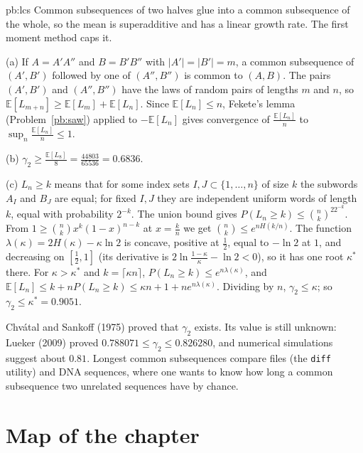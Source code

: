 \begin{solution}{pb:lcs}
\idea Common subsequences of two halves glue into a common subsequence of the whole, so the mean is superadditive and has a linear growth rate. The first moment
method caps it.

\writeup (a) If $A=A'A''$ and $B=B'B''$ with $|A'|=|B'|=m$, a common subsequence of $(A',B')$ followed by one of $(A'',B'')$ is common to $(A,B)$. The pairs $(A',B')$ and $(A'',B'')$ have the laws of
random pairs of lengths $m$ and $n$, so $\mathbb E[L_{m+n}]\ge\mathbb E[L_m]+\mathbb E[L_n]$. Since $\mathbb E[L_n]\le n$, Fekete's lemma (Problem~\ref{pb:saw}) applied to $-\mathbb E[L_n]$ gives convergence of $\frac{\mathbb E[L_n]}n$ to
$\sup_n\frac{\mathbb E[L_n]}n\le1$.

(b) $\gamma_2\ge\frac{\mathbb E[L_8]}8=\frac{44803}{65536}=0.6836$.

(c) $L_n\ge k$ means that for some index sets $I,J\subset\{1,\dots,n\}$ of size $k$ the subwords $A_I$ and $B_J$ are equal; for fixed $I,J$ they are independent uniform words of length $k$, equal with
probability $2^{-k}$. The union bound gives $P(L_n\ge k)\le\binom nk^22^{-k}$. From $1\ge\binom nkx^k(1-x)^{n-k}$ at $x=\frac kn$ we get $\binom nk\le e^{nH(k/n)}$. The function $\lambda(\kappa)=2H(\kappa)-\kappa\ln2$ is
concave, positive at $\frac12$, equal to $-\ln2$ at $1$, and decreasing on $[\frac12,1]$ (its derivative is $2\ln\frac{1-\kappa}\kappa-\ln2<0$), so it has one root $\kappa^*$ there. For $\kappa>\kappa^*$ and $k=\lceil\kappa n\rceil$,
$P(L_n\ge k)\le e^{n\lambda(\kappa)}$, and $\mathbb E[L_n]\le k+nP(L_n\ge k)\le\kappa n+1+ne^{n\lambda(\kappa)}$. Dividing by $n$, $\gamma_2\le\kappa$; so $\gamma_2\le\kappa^*=0.9051$.

\leads Chv\'atal and Sankoff (1975) proved that $\gamma_2$ exists. Its value is still unknown: Lueker (2009) proved $0.788071\le\gamma_2\le0.826280$, and numerical simulations suggest about
$0.81$. Longest common subsequences compare files (the \texttt{diff} utility) and DNA sequences, where one wants to know how long a common subsequence two unrelated
sequences have by chance.
\end{solution}

\section*{Map of the chapter}

